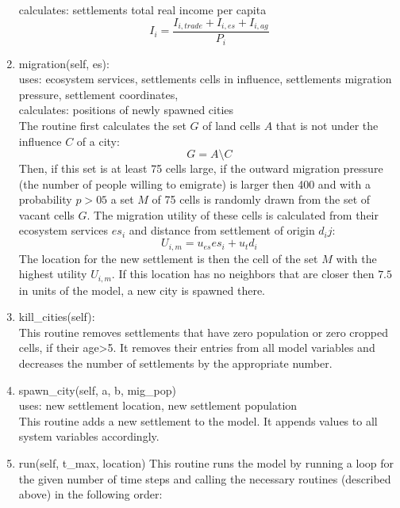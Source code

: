 \begin{enumerate}
		calculates: settlements total real income per capita\\
		\begin{equation}
			I_i = \frac{I_{i, trade}+I_{i, es} + I_{i, ag}}{P_i}
			\label{real_income_pc}
		\end{equation}
	\item migration(self, es):\\
		uses: ecosystem services, settlements cells in influence, settlements migration pressure, settlement coordinates, \\
		calculates: positions of newly spawned cities\\
		The routine first calculates the set $G$ of land cells $A$ that is not under the influence $C$ of a city:
		\begin{equation}
			G = A \setminus C
			\label{vacant_cells}
		\end{equation}
		Then, if this set is at least 75 cells large, if the outward migration pressure (the number of people willing to emigrate) is larger then 400 and with a probability $p>05$ a set $M$ of 75 cells is randomly drawn from the set of vacant cells $G$. The migration utility of these cells is calculated from their ecosystem services $es_i$ and distance from settlement of origin $d_ij$:
		\begin{equation}
			U_{i,m} = u_{es} es_i + u_{t}d_i
			\label{migration_utility}
		\end{equation}
		The location for the new settlement is then the cell of the set $M$ with the highest utility $U_{i,m}$.
		If this location has no neighbors that are closer then $7.5$ in units of the model, a new city is spawned there.
	\item kill_cities(self):\\
		This routine removes settlements that have zero population or zero cropped cells, if their age>5.
		It removes their entries from all model variables and decreases the number of settlements by the appropriate number.
	\item spawn_city(self, a, b, mig_pop)\\
		uses: new settlement location, new settlement population\\
		This routine adds a new settlement to the model. It appends values to all system variables accordingly.
	\item run(self, t_max, location)
		This routine runs the model by running a loop for the given number of time steps and calling the necessary routines (described above) in the following order:
		\begin{enumerate}

\end{enumerate}
\end{enumerate}
